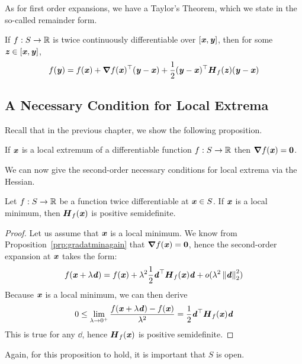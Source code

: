 As for first order expansions, we have a Taylor's Theorem, which we
state in the so-called remainder form.
\begin{theorem}
  \label{thm:taylorremainder2}
  If $f:S\to \R$ is twice continuously differentiable over $[\xx, \yy]$, then for
  some $\zz \in [\xx, \yy]$,
\begin{displaymath}
  f(\yy) = f(\xx) + \grad f(\xx)^\trp (\yy-\xx)
  + \frac{1}{2}(\yy-\xx)^\trp  \HH_f(\zz) (\yy-\xx)
\end{displaymath}
\end{theorem}

\subsection{A Necessary Condition for Local Extrema}

Recall that in the previous chapter, we show the following proposition.
\begin{proposition}
\label{prp:gradatminagain}
    If $\xx$ is a local extremum of a differentiable function
    $f:S\rightarrow \R$
    then $\grad f(\xx) = \veczero$.
\end{proposition}

We can now give the second-order necessary conditions for local extrema via the Hessian.
\begin{theorem}
Let $f:S \rightarrow\R$ be a function twice differentiable at
    $\xx\in S$.
    If $\xx$ is a local minimum, then $\HH_f(\xx)$ is positive
    semidefinite.
\end{theorem}
\begin{proof}
  Let us assume that $\xx$ is a local minimum. We know from
    Proposition~\ref{prp:gradatminagain} that $\grad f(\xx)= \veczero$, hence the second-order expansion at $\xx$ takes the form:
    \begin{displaymath}
        f(\xx + \lambda\dd) = f(\xx) + \lambda^2 \frac{1}{2} \dd^\trp
        \HH_f(\xx)\dd + o(\lambda^2 \norm{\dd}_2^2)
    \end{displaymath}
    Because $\xx$ is a local minimum,
    we can then derive
\begin{displaymath}
  0 \leq\lim_{\lambda \to 0^+}
  \frac{f(\xx+\lambda\dd)-f(\xx)}{\lambda^2} = \frac{1}{2}\dd^\trp \HH_f(\xx)\dd
\end{displaymath}
This is true for any $\dd$, hence $\HH_f(\xx)$ is positive semidefinite.
\end{proof}
  \begin{remark}
    Again, for this proposition to hold, it is important that $S$ is
    open.
  \end{remark}

